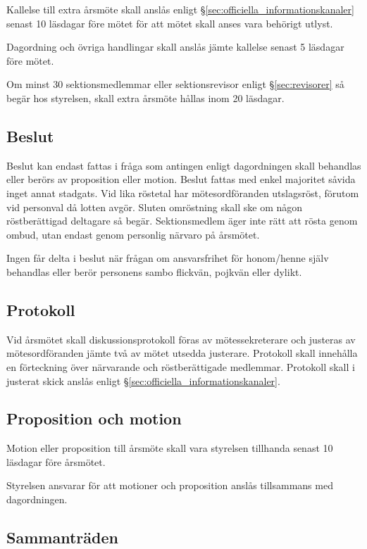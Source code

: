 \documentclass{dgovdoc}
\begin{document}
Kallelse till extra årsmöte skall anslås enligt
\S\ref{sec:officiella_informationskanaler} senast 10 läsdagar före mötet för att mötet skall anses vara
behörigt utlyst.

Dagordning och övriga handlingar skall anslås jämte kallelse senast
5 läsdagar före mötet.

Om minst 30 sektionsmedlemmar eller sektionsrevisor enligt \S\ref{sec:revisorer} så begär hos styrelsen, skall extra årsmöte hållas inom 20 läsdagar.

\subsection{Beslut}

Beslut kan endast fattas i fråga som antingen enligt dagordningen skall behandlas
eller berörs av proposition eller motion. Beslut fattas med enkel majoritet
såvida inget annat stadgats. Vid lika röstetal har mötesordföranden
utslagsröst, förutom vid personval då lotten avgör. Sluten omröstning skall ske
om någon röstberättigad deltagare så begär. Sektionsmedlem äger inte rätt att rösta genom ombud, utan
endast genom personlig närvaro på årsmötet.

Ingen får delta i beslut när frågan om ansvarsfrihet
för honom/henne själv behandlas eller berör personens sambo flickvän, pojkvän eller dylikt.

\subsection{Protokoll}

Vid årsmötet skall diskussionsprotokoll föras av mötessekreterare och justeras av
mötesordföranden jämte två av mötet utsedda justerare. Protokoll skall
innehålla en förteckning över närvarande och röstberättigade medlemmar. Protokoll
skall i justerat skick anslås enligt \S\ref{sec:officiella_informationskanaler}.

\subsection{Proposition och motion}

Motion eller proposition till årsmöte skall vara styrelsen tillhanda senast 10
läsdagar före årsmötet.

Styrelsen ansvarar för att motioner och proposition anslås tillsammans med dagordningen.

\subsection{Sammanträden}
\end{document}

